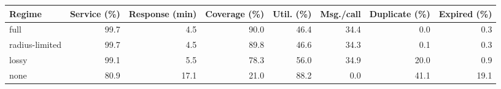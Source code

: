 \begin{center}
\scriptsize
\setlength{\tabcolsep}{2.5pt}
\label{tab:communication-rates}
\begin{tabular}{lrrrrrrr}
\toprule
Regime & Service (\%) & Response (min) & Coverage (\%) & Util. (\%) & Msg./call & Duplicate (\%) & Expired (\%) \\
\midrule
full & 99.7 & 4.5 & 90.0 & 46.4 & 34.4 & 0.0 & 0.3 \\
radius-limited & 99.7 & 4.5 & 89.8 & 46.6 & 34.3 & 0.1 & 0.3 \\
lossy & 99.1 & 5.5 & 78.3 & 56.0 & 34.9 & 20.0 & 0.9 \\
none & 80.9 & 17.1 & 21.0 & 88.2 & 0.0 & 41.1 & 19.1 \\
\bottomrule
\end{tabular}
\end{center}
